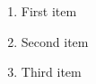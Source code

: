 \documentclass{article}
\begin{document}
\begin{enumerate}
\item First item
\item Second item
\item Third item
\end{enumerate}
\end{document}
